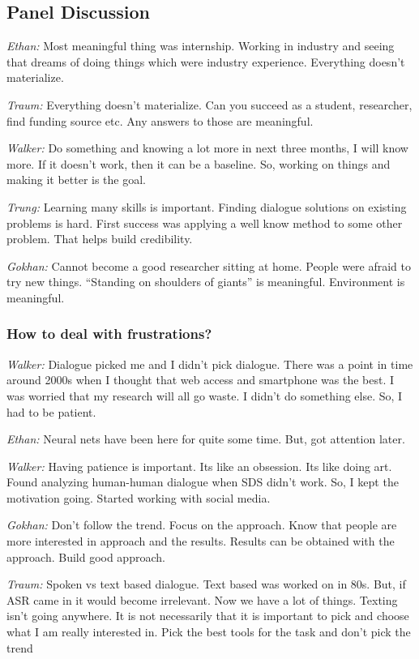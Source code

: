 \documentclass[12pt]{article}
\begin{document}
\subsection{Panel Discussion}

{\it Ethan:} Most meaningful thing was internship. Working in industry and seeing that dreams of doing things which were industry experience. Everything doesn’t materialize.

{\it Traum:} Everything doesn’t materialize. Can you succeed as a student, researcher, find funding source etc. Any answers to those are meaningful.

{\it Walker:} Do something and knowing a lot more in next three months, I will know more. If it doesn’t work, then it can be a baseline. So, working on things and making it better is the goal.

{\it Trung:} Learning many skills is important. Finding dialogue solutions on existing problems is hard. First success was applying a well know method to some other problem. That helps build credibility.

{\it Gokhan:} Cannot become a good researcher sitting at home. People were afraid to try new things. “Standing on shoulders of giants” is meaningful. Environment is meaningful.

\subsubsection*{How to deal with frustrations?}

{\it Walker:} Dialogue picked me and I didn’t pick dialogue. There was a point in time around 2000s when I thought that web access and smartphone was the best. I was worried that my research will all go waste. I didn’t do something else. So, I had to be patient.

{\it Ethan:} Neural nets have been here for quite some time. But, got attention later.

{\it Walker:} Having patience is important. Its like an obsession. Its like doing art. Found analyzing human-human dialogue when SDS didn’t work. So, I kept the motivation going. Started working with social media.

{\it Gokhan:} Don’t follow the trend. Focus on the approach. Know that people are more interested in approach and the results. Results can be obtained with the approach. Build good approach.

{\it Traum:} Spoken vs text based dialogue. Text based was worked on in 80s. But, if ASR came in it would become irrelevant. Now we have a lot of things. Texting isn’t going anywhere. It is not necessarily that it is important to pick and choose what I am really interested in. Pick the best tools for the task and don’t pick the trend
\end{document}
